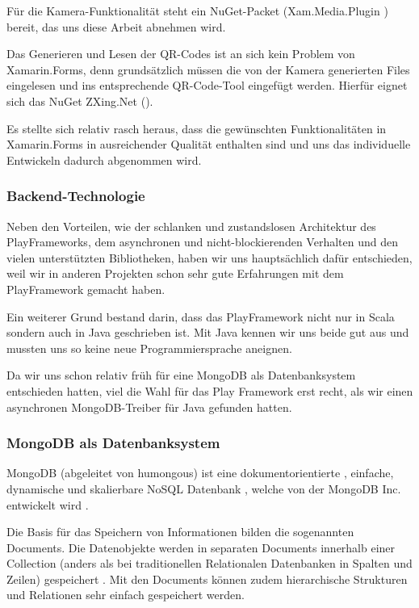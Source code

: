 Für die Kamera-Funktionalität steht ein NuGet-Packet (Xam.Media.Plugin \cite{xam-media-plugin}) bereit, das uns diese Arbeit abnehmen wird.

Das Generieren und Lesen der QR-Codes ist an sich kein Problem von Xamarin.Forms, denn grundsätzlich müssen die von der Kamera generierten Files eingelesen und ins entsprechende QR-Code-Tool eingefügt werden. Hierfür eignet sich das NuGet ZXing.Net (\cite{zxing.net}). 

Es stellte sich relativ rasch heraus, dass die gewünschten Funktionalitäten in Xamarin.Forms in ausreichender Qualität enthalten sind und uns das individuelle Entwickeln dadurch abgenommen wird.

\subsubsection{Backend-Technologie}
Neben den Vorteilen, wie der schlanken und zustandslosen Architektur des PlayFrameworks, dem asynchronen und nicht-blockierenden Verhalten und den vielen unterstützten Bibliotheken, haben wir uns hauptsächlich dafür entschieden, weil wir in anderen Projekten schon sehr gute Erfahrungen mit dem PlayFramework gemacht haben.

Ein weiterer Grund bestand darin, dass das PlayFramework nicht nur in Scala sondern auch in Java geschrieben ist. Mit Java kennen wir uns beide gut aus und mussten uns so keine neue Programmiersprache aneignen.

Da wir uns schon relativ früh für eine MongoDB als Datenbanksystem entschieden hatten, viel die Wahl für das Play Framework erst recht, als wir einen asynchronen MongoDB-Treiber für Java gefunden hatten.

\subsubsection{MongoDB als Datenbanksystem}
MongoDB (abgeleitet von humongous) ist eine dokumentorientierte \cite{MonogDBWikipedia}, einfache, dynamische und skalierbare NoSQL Datenbank \cite{MonogDBDZone}, welche von der MongoDB Inc. entwickelt wird \cite{MonogDB}. 

Die Basis für das Speichern von Informationen bilden die sogenannten Documents. Die Datenobjekte werden in separaten Documents innerhalb einer Collection (anders als bei traditionellen Relationalen Datenbanken in Spalten und Zeilen) gespeichert \cite{MonogDBDZone}. Mit den Documents können zudem  hierarchische Strukturen und Relationen sehr einfach gespeichert werden.

